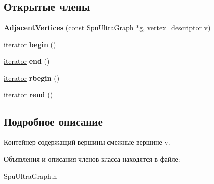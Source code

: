 \subsection*{Открытые члены}
\begin{DoxyCompactItemize}
\item 
\mbox{\label{class_s_p_u___g_r_a_p_h_1_1_spu_ultra_graph_1_1_adjacent_vertices_a63ae31425be10389d7e5b7a7f8dbf275}} 
{\bfseries Adjacent\+Vertices} (const \hyperlink{class_s_p_u___g_r_a_p_h_1_1_spu_ultra_graph}{Spu\+Ultra\+Graph} $\ast$g, vertex\+\_\+descriptor v)
\item 
\mbox{\label{class_s_p_u___g_r_a_p_h_1_1_spu_ultra_graph_1_1_adjacent_vertices_a08c87852160ae17145c945a8e74514f3}} 
\hyperlink{class_s_p_u___g_r_a_p_h_1_1_spu_ultra_graph_1_1_adjacent_vertices_iterator}{iterator} {\bfseries begin} ()
\item 
\mbox{\label{class_s_p_u___g_r_a_p_h_1_1_spu_ultra_graph_1_1_adjacent_vertices_a6b40458eab68f1f541a0fc0462edd2ce}} 
\hyperlink{class_s_p_u___g_r_a_p_h_1_1_spu_ultra_graph_1_1_adjacent_vertices_iterator}{iterator} {\bfseries end} ()
\item 
\mbox{\label{class_s_p_u___g_r_a_p_h_1_1_spu_ultra_graph_1_1_adjacent_vertices_a39a2953d72cb264f39f75673522680b7}} 
\hyperlink{class_s_p_u___g_r_a_p_h_1_1_spu_ultra_graph_1_1_adjacent_vertices_iterator}{iterator} {\bfseries rbegin} ()
\item 
\mbox{\label{class_s_p_u___g_r_a_p_h_1_1_spu_ultra_graph_1_1_adjacent_vertices_a2a6b807d6fc5c812ffee8a98566d50a5}} 
\hyperlink{class_s_p_u___g_r_a_p_h_1_1_spu_ultra_graph_1_1_adjacent_vertices_iterator}{iterator} {\bfseries rend} ()
\end{DoxyCompactItemize}


\subsection{Подробное описание}
Контейнер содержащий вершины смежные вершине v. 

Объявления и описания членов класса находятся в файле\+:\begin{DoxyCompactItemize}
\item 
Spu\+Ultra\+Graph.\+h\end{DoxyCompactItemize}
